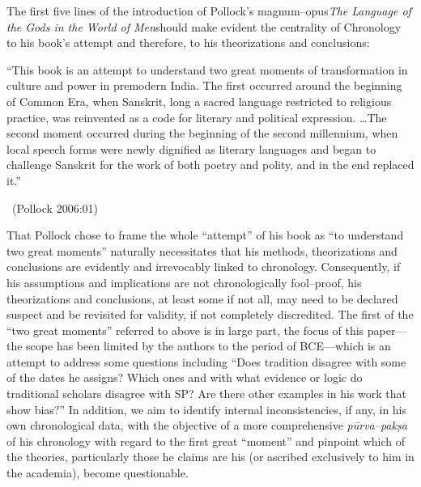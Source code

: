 The first five lines of the introduction of Pollock’s magnum–opus\textit{The Language of the Gods in the World of Men}should make evident the centrality of Chronology to his book’s attempt and therefore, to his theorizations and conclusions:

\begin{myquote}
“This book is an attempt to understand two great moments of transformation in culture and power in premodern India. The first occurred around the beginning of Common Era, when Sanskrit, long a sacred language restricted to religious practice, was reinvented as a code for literary and political expression. …The second moment occurred during the beginning of the second millennium, when local speech forms were newly dignified as literary languages and began to challenge Sanskrit for the work of both poetry and polity, and in the end replaced it.” 

~\hfill (Pollock 2006:01)
\end{myquote}

That Pollock chose to frame the whole “attempt” of his book as “to understand two great moments” naturally necessitates that his methods, theorizations and conclusions are evidently and irrevocably linked to chronology. Consequently, if his assumptions and implications are not chronologically fool–proof, his theorizations and conclusions, at least some if not all, may need to be declared suspect and be revisited for validity, if not completely discredited. The first of the “two great moments” referred to above is in large part, the focus of this paper—the scope has been limited by the authors to the period of BCE—which is an attempt to address some questions including “Does tradition disagree with some of the dates he assigns? Which ones and with what evidence or logic do traditional scholars disagree with SP? Are there other examples in his work that show bias?” In addition, we aim to identify internal inconsistencies, if any, in his own chronological data, with the objective of a more comprehensive \textit{pūrva–pakṣa} of his chronology with regard to the first great “moment” and pinpoint which of the theories, particularly those he claims are his (or ascribed exclusively to him in the academia), become questionable.

